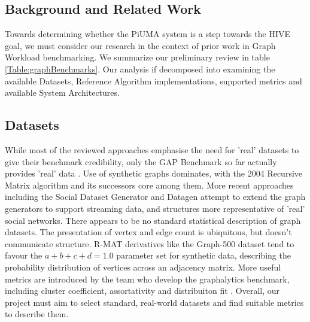 \documentclass[letterpaper, 10pt]{article}
\begin{document}
\begin{multicols}{2}
    \section{Background and Related Work}
        \par{Towards determining whether the PiUMA system is a step towards the HIVE goal, we must consider our research in the context of prior work in Graph Workload benchmarking. 
        We summarize our preliminary review in table \ref{Table:graphBenchmarks}. 
        Our analysis if decomposed into examining the  available Datasets, Reference Algorithm implementations, supported metrics and available System Architectures. }

        \subsection{Datasets}
        \par{While most of the reviewed approaches emphasise the need for 'real' datasets to give their benchmark credibility, only the GAP Benchmark so far actually provides 'real' data \cite{Beamer2017}. 
        Use of synthetic graphs dominates, with the 2004 Recursive Matrix algorithm \cite{Chakrabarti2004} and its successors core among them. 
        More recent approaches including the Social Dataset Generator \cite{Angles2013} and Datagen \cite{Capota2015} attempt to extend the graph generators to support streaming data, and structures more representative of 'real' social networks.
        There appears to be no standard statistical description of graph datasets. 
        The presentation of vertex and edge count is ubiquitous, but doesn't communicate structure. 
        R-MAT derivatives like the Graph-500 dataset \cite{Murphy2010} tend to favour the $a+b+c+d=1.0$} parameter set for synthetic data, describing the probability distribution of vertices across an adjacency matrix.
        More useful metrics are introduced by the team who develop the graphalytics benchmark, including cluster coefficient, assortativity and distribuiton fit \cite{Capota2015}.
        Overall, our project must aim to select standard, real-world datasets and find suitable metrics to describe them.


\end{multicols}
\end{document}

